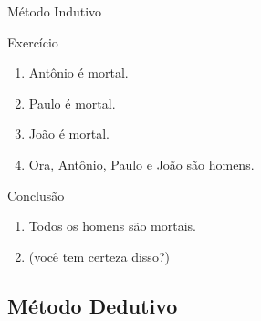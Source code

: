 \documentclass{beamer}
\begin{document}
\begin{frame}{Método Indutivo}
  \begin{block}{Exercício}
    \begin{enumerate}
    \item Antônio é mortal.
    \item Paulo é mortal.
    \item João é mortal.
    \item Ora, Antônio, Paulo e João são homens.
    \end{enumerate}
  \end{block}
  \begin{block}{Conclusão}
    \begin{enumerate}
    \item Todos os homens são mortais.
    \item (você tem certeza disso?)
    \end{enumerate}
  \end{block}
\end{frame}

\subsection{Método Dedutivo}
\end{document}

